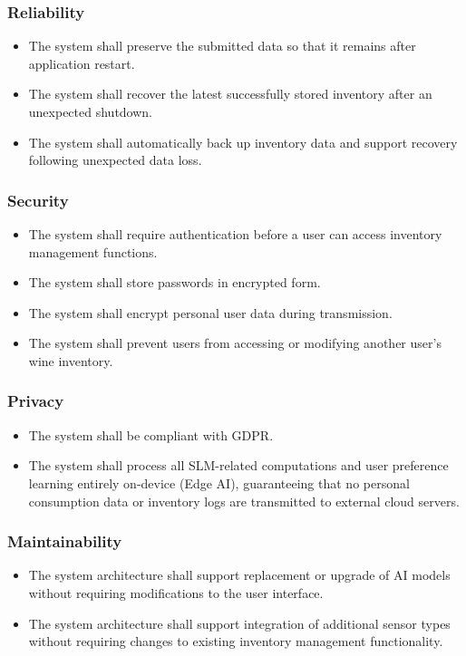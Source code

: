 \documentclass[conference]{IEEEtran}
\begin{document}
\subsubsection{Reliability}
\begin{itemize}
    \item The system shall preserve the submitted data so that it remains after application restart.
    \item The system shall recover the latest successfully stored inventory after an unexpected shutdown.
    \item The system shall automatically back up inventory data and support recovery following unexpected data loss.
\end{itemize}

\subsubsection{Security}
\begin{itemize}
    \item The system shall require authentication before a user can access inventory management functions.
    \item The system shall store passwords in encrypted form.
    \item The system shall encrypt personal user data during transmission.
    \item The system shall prevent users from accessing or modifying another user's wine inventory.
\end{itemize}

\subsubsection{Privacy}
\begin{itemize}
    \item The system shall be compliant with GDPR.
    \item The system shall process all SLM-related computations and user preference learning entirely on-device (Edge AI), guaranteeing that no personal consumption data or inventory logs are transmitted to external cloud servers.
\end{itemize}

\subsubsection{Maintainability}
\begin{itemize}
    \item The system architecture shall support replacement or upgrade of AI models without requiring modifications to the user interface.
    \item The system architecture shall support integration of additional sensor types without requiring changes to existing inventory management functionality.
\end{itemize}
\end{document}
